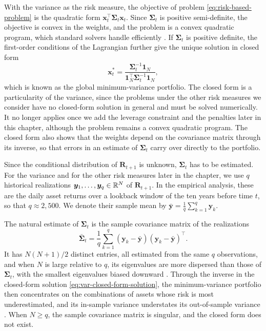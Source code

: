 With the variance as the risk measure, the objective of problem \eqref{eq:risk-based-problem} is the quadratic form
$\bm{x}_t^\top \bm{\Sigma}_t \bm{x}_t$. Since $\bm{\Sigma}_t$ is positive semi-definite, the objective is convex in the
weights, and the problem is a convex quadratic program, which standard solvers handle efficiently
\cite{boyd2004convex}. If $\bm{\Sigma}_t$ is positive definite, the first-order conditions of the Lagrangian further give
the unique solution in closed form
\begin{equation} \label{eq:var-closed-form-solution}
    \bm{x}_t^* = \frac{\bm{\Sigma}_t^{-1} \bm{1}_N}{\bm{1}_N^\top \bm{\Sigma}_t^{-1} \bm{1}_N},
\end{equation}
which is known as the global minimum-variance portfolio. The closed form is a particularity of the variance, since the
problems under the other risk measures we consider have no closed-form solution in general and must be solved
numerically. It no longer applies once we add the leverage constraint and the penalties later in this chapter, although
the problem remains a convex quadratic program. The closed form also shows that the weights depend on the covariance
matrix through its inverse, so that errors in an estimate of $\bm{\Sigma}_t$ carry over directly to the portfolio.

Since the conditional distribution of $\bm{R}_{t+1}$ is unknown, $\bm{\Sigma}_t$ has to be estimated. For the variance
and for the other risk measures later in the chapter, we use $q$ historical realizations $\bm{y}_1, \dots, \bm{y}_q \in \mathbb{R}^N$ of
$\bm{R}_{t+1}$. In the empirical analysis, these are the daily asset returns over a lookback window of the ten years
before time $t$, so that $q \approx 2{,}500$. We denote their sample mean
by $\bar{\bm{y}} = \frac{1}{q} \sum_{k=1}^q \bm{y}_k$.

The natural estimate of $\bm{\Sigma}_t$ is the sample covariance matrix of the realizations
\begin{equation*}
    \bar{\bm{\Sigma}}_t = \frac{1}{q} \sum_{k=1}^q (\bm{y}_k - \bar{\bm{y}})(\bm{y}_k - \bar{\bm{y}})^\top.
\end{equation*}
It has $N(N+1)/2$ distinct
entries, all estimated from the same $q$ observations, and when $N$ is large relative to $q$, its eigenvalues are more
dispersed than those of $\bm{\Sigma}_t$, with the smallest eigenvalues biased downward \cite{LedoitWolf2004}. Through
the inverse in the closed-form solution \eqref{eq:var-closed-form-solution}, the minimum-variance portfolio then concentrates on the combinations of assets whose
risk is most underestimated, and its in-sample variance understates its out-of-sample variance \cite{ElKaroui2010}.
When $N \ge q$, the sample covariance matrix is singular, and the closed form does not exist.

